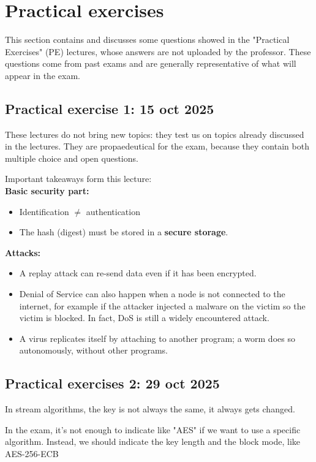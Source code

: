 \chapter[]{Practical exercises}
This section contains and discusses some questions showed in the "Practical Exercises" (PE) lectures, whose answers are not uploaded by the professor. These questions come from past exams and are generally representative of what will appear in the exam.

\section{Practical exercise 1: 15 oct 2025}
These lectures do not bring new topics: they test us on topics already discussed in the lectures. They are propaedeutical for the exam, because they contain both multiple choice and open questions.

Important takeaways form this lecture:\\
\textbf{Basic security part:}
\begin{itemize}
    \item Identification $\neq$ authentication
    \item The hash (digest) must be stored in a \textbf{secure storage}.
\end{itemize}

\textbf{Attacks:}
\begin{itemize}
    \item A replay attack can re-send data even if it has been encrypted.
    \item Denial of Service can also happen when a node is not connected to the internet, for example if the attacker injected a malware on the victim so the victim is blocked. In fact, DoS is still a widely encountered attack.
    \item A virus replicates itself by attaching to another program; a worm does so autonomously, without other programs.
\end{itemize}


\section{Practical exercises 2: 29 oct 2025}
In stream algorithms, the key is not always the same, it always gets changed.

In the exam, it's not enough to indicate like "AES" if we want to use a specific algorithm. Instead, we should indicate the key length and the block mode, like AES-256-ECB


